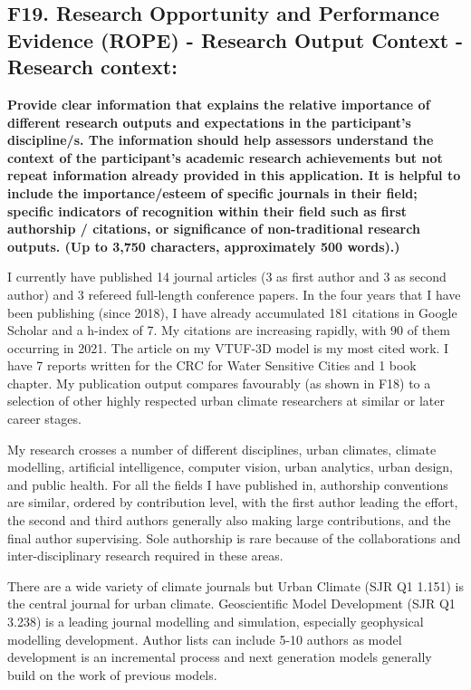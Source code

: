 \subsection*{\TitleFont F19. Research Opportunity and Performance Evidence (ROPE) - Research Output Context - Research context: }

\textbf{Provide clear information that explains the relative importance of different research outputs and expectations in the participant's discipline/s. The information should help assessors understand the context of the participant's academic research achievements but not repeat information already provided in this application. It is helpful to include the importance/esteem of specific journals in their field; specific indicators of recognition within their field such as first authorship / citations, or significance of non-traditional research outputs. (Up to 3,750 characters, approximately 500 words).)}

I currently have published 14 journal articles (3 as first author and 3 as second author) and 3 refereed full-length conference papers. In the four years that I have been publishing (since 2018), I have already accumulated 181 citations in Google Scholar and a h-index of 7. My citations are increasing rapidly, with 90 of them occurring in 2021. The article on my VTUF-3D model is my most cited work. I have 7 reports written for the CRC for Water Sensitive Cities and 1 book chapter. My publication output compares favourably (as shown in F18) to a selection of other highly respected urban climate researchers at similar or later career stages. 

My research crosses a number of different disciplines, urban climates, climate modelling, artificial intelligence, computer vision, urban analytics, urban design, and public health. For all the fields I have published in, authorship conventions are similar, ordered by contribution level, with the first author leading the effort, the second and third authors generally also making large contributions, and the final author supervising. Sole authorship is rare because of the collaborations and inter-disciplinary research required in these areas.

There are a wide variety of climate journals but Urban Climate (SJR Q1 1.151) is the central journal for urban climate. Geoscientific Model Development (SJR Q1 3.238) is a leading journal modelling and simulation, especially geophysical modelling development. Author lists can include 5-10 authors as model development is an incremental process and next generation models generally build on the work of previous models.


